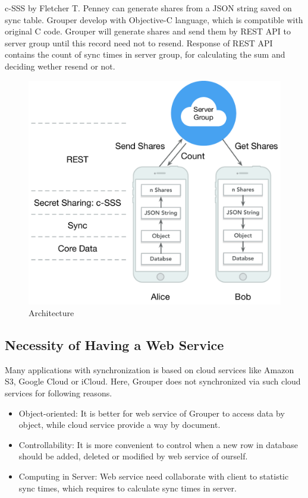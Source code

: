 \documentclass[twocolumn,10pt]{article}
\begin{document}
c-SSS by Fletcher T. Penney can generate shares from a JSON string saved on sync table. Grouper develop with Objective-C language, which is compatible with original C code. Grouper will generate shares and send them by REST API to server group until this record need not to resend. Response of REST API contains the count of sync times in server group, for calculating the sum and deciding wether resend or not.

\begin{figure}[t]
\centering
\includegraphics[scale=0.4]{architecture}
\caption{Architecture}
\end{figure}

\subsection{Necessity of Having a Web Service}
Many applications with synchronization is based on cloud services like Amazon S3, Google Cloud or iCloud. Here, Grouper does not synchronized via such cloud services for following reasons.
\begin{itemize}
\setlength{\itemsep}{1pt}
\setlength{\parskip}{0pt}
\setlength{\parsep}{0pt}
    \item Object-oriented: It is better for web service of Grouper to access data by object, while cloud service provide a way by document. 
    \item Controllability: It is more convenient to control when a new row in database should be added, deleted or modified by web service of ourself. 
    \item Computing in Server: Web service need collaborate with client to statistic sync times, which requires to calculate sync times in server.
\end{itemize}
\end{document}

